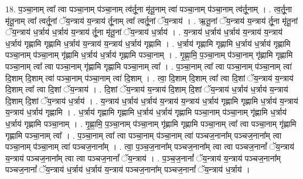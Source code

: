 \documentclass[17pt]{extarticle}
\begin{document}
18. प॒ञ्चा॒नाम् त्वा᳚ त्वा पञ्चा॒नाम् प॑ञ्चा॒नाम् त्व॑र्तू॒ना मृ॑तू॒नाम् त्वा॑ पञ्चा॒नाम् प॑ञ्चा॒नाम् त्व॑र्तू॒नाम् । . त्व॒र्तू॒ना मृ॑तू॒नाम् त्वा᳚ त्वर्तू॒नां ॅय॒न्त्राय॑ य॒न्त्राय॑ र्तू॒नाम् त्वा᳚ त्वर्तू॒नां ॅय॒न्त्राय॑ । . ऋ॒तू॒नां ॅय॒न्त्राय॑ य॒न्त्राय॑ र्तू॒ना मृ॑तू॒नां ॅय॒न्त्राय॑ ध॒र्त्राय॑ ध॒र्त्राय॑ य॒न्त्राय॑ र्तू॒ना मृ॑तू॒नां ॅय॒न्त्राय॑ ध॒र्त्राय॑ । . य॒न्त्राय॑ ध॒र्त्राय॑ ध॒र्त्राय॑ य॒न्त्राय॑ य॒न्त्राय॑ ध॒र्त्राय॑ गृह्णामि गृह्णामि ध॒र्त्राय॑ य॒न्त्राय॑ य॒न्त्राय॑ ध॒र्त्राय॑ गृह्णामि । . ध॒र्त्राय॑ गृह्णामि गृह्णामि ध॒र्त्राय॑ ध॒र्त्राय॑ गृह्णामि पञ्चा॒नाम् प॑ञ्चा॒नाम् गृ॑ह्णामि ध॒र्त्राय॑ ध॒र्त्राय॑ गृह्णामि पञ्चा॒नाम् । . गृ॒ह्णा॒मि॒ प॒ञ्चा॒नाम् प॑ञ्चा॒नाम् गृ॑ह्णामि गृह्णामि पञ्चा॒नाम् त्वा᳚ त्वा पञ्चा॒नाम् गृ॑ह्णामि गृह्णामि पञ्चा॒नाम् त्वा᳚ । . प॒ञ्चा॒नाम् त्वा᳚ त्वा पञ्चा॒नाम् प॑ञ्चा॒नाम् त्वा॑ दि॒शाम् दि॒शाम् त्वा॑ पञ्चा॒नाम् प॑ञ्चा॒नाम् त्वा॑ दि॒शाम् । . त्वा॒ दि॒शाम् दि॒शाम् त्वा᳚ त्वा दि॒शां ॅय॒न्त्राय॑ य॒न्त्राय॑ दि॒शाम् त्वा᳚ त्वा दि॒शां ॅय॒न्त्राय॑ । . दि॒शां ॅय॒न्त्राय॑ य॒न्त्राय॑ दि॒शाम् दि॒शां ॅय॒न्त्राय॑ ध॒र्त्राय॑ ध॒र्त्राय॑ य॒न्त्राय॑ दि॒शाम् दि॒शां ॅय॒न्त्राय॑ ध॒र्त्राय॑ । . य॒न्त्राय॑ ध॒र्त्राय॑ ध॒र्त्राय॑ य॒न्त्राय॑ य॒न्त्राय॑ ध॒र्त्राय॑ गृह्णामि गृह्णामि ध॒र्त्राय॑ य॒न्त्राय॑ य॒न्त्राय॑ ध॒र्त्राय॑ गृह्णामि । . ध॒र्त्राय॑ गृह्णामि गृह्णामि ध॒र्त्राय॑ ध॒र्त्राय॑ गृह्णामि पञ्चा॒नाम् प॑ञ्चा॒नाम् गृ॑ह्णामि ध॒र्त्राय॑ ध॒र्त्राय॑ गृह्णामि पञ्चा॒नाम् । . गृ॒ह्णा॒मि॒ प॒ञ्चा॒नाम् प॑ञ्चा॒नाम् गृ॑ह्णामि गृह्णामि पञ्चा॒नाम् त्वा᳚ त्वा पञ्चा॒नाम् गृ॑ह्णामि गृह्णामि पञ्चा॒नाम् त्वा᳚ । . प॒ञ्चा॒नाम् त्वा᳚ त्वा पञ्चा॒नाम् प॑ञ्चा॒नाम् त्वा॑ पञ्चज॒नाना᳚म् पञ्चज॒नाना᳚म् त्वा पञ्चा॒नाम् प॑ञ्चा॒नाम् त्वा॑ पञ्चज॒नाना᳚म् । . त्वा॒ प॒ञ्च॒ज॒नाना᳚म् पञ्चज॒नाना᳚म् त्वा त्वा पञ्चज॒नानां᳚ ॅय॒न्त्राय॑ य॒न्त्राय॑ पञ्चज॒नाना᳚म् त्वा त्वा पञ्चज॒नानां᳚ ॅय॒न्त्राय॑ । . प॒ञ्च॒ज॒नानां᳚ ॅय॒न्त्राय॑ य॒न्त्राय॑ पञ्चज॒नाना᳚म् पञ्चज॒नानां᳚ ॅय॒न्त्राय॑ ध॒र्त्राय॑ ध॒र्त्राय॑ य॒न्त्राय॑ पञ्चज॒नाना᳚म् पञ्चज॒नानां᳚ ॅय॒न्त्राय॑ ध॒र्त्राय॑ । \newline
\end{document}
